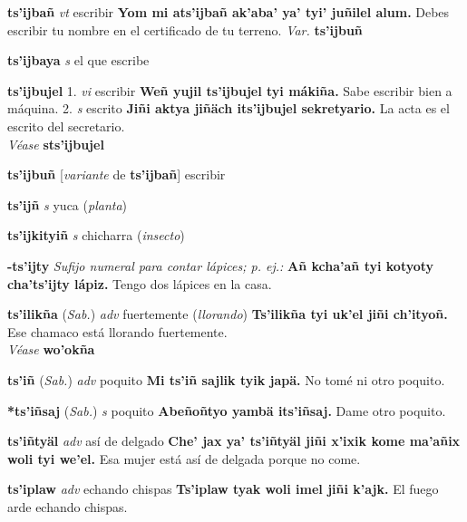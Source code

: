 \documentclass[10pt]{scrbook}
\newcommand{\entry}[1]{\textbf{#1}}
\newcommand{\onedefinition}[1]{#1.}
\newcommand{\nontranslationdef}[1]{\textit{#1}}
\newcommand{\partofspeech}[1]{\textit{#1}}
\newcommand{\spanishtranslation}[1]{#1}
\newcommand{\clarification}[1]{(\textit{#1})}
\newcommand{\cholexample}[1]{\textbf{#1}}
\newcommand{\exampletranslation}[1]{#1}
\newcommand{\alsosee}[1]{\\\textit{Véase} \textbf{#1}}
\newcommand{\relevantdialect}[1]{(\textit{#1})}
\newcommand{\variation}[1]{\textit{Var.} \textbf{#1}}
\newcommand{\conjugationtense}[1]{[\textit{#1}}
\newcommand{\conjugationverb}[1]{de \textbf{#1}]}
\begin{document}
\begin{multicols}{2}
\entry{ts'ijbañ}
\partofspeech{vt}
\spanishtranslation{escribir}
\cholexample{Yom mi ats'ijbañ ak'aba' ya' tyi' juñilel alum.}
\exampletranslation{Debes escribir tu nombre en el certificado de tu terreno.}
\variation{ts'ijbuñ}

\entry{ts'ijbaya}
\partofspeech{s}
\spanishtranslation{el que escribe}

\entry{ts'ijbujel}
\onedefinition{1}
\partofspeech{vi}
\spanishtranslation{escribir}
\cholexample{Weñ yujil ts'ijbujel tyi mákiña.}
\exampletranslation{Sabe escribir bien a máquina.}
\onedefinition{2}
\partofspeech{s}
\spanishtranslation{escrito}
\cholexample{Jiñi aktya jiñäch its'ijbujel sekretyario.}
\exampletranslation{La acta es el escrito del secretario.}
\alsosee{sts'ijbujel}

\entry{ts'ijbuñ}
\conjugationtense{variante}
\conjugationverb{ts'ijbañ}
\spanishtranslation{escribir}

\entry{ts'ijñ}
\partofspeech{s}
\spanishtranslation{yuca}
\clarification{planta}

\entry{ts'ijkityiñ}
\partofspeech{s}
\spanishtranslation{chicharra}
\clarification{insecto}

\entry{-ts'ijty}
\nontranslationdef{Sufijo numeral para contar lápices; p. ej.:}
\cholexample{Añ kcha'añ tyi kotyoty cha'ts'ijty lápiz.}
\exampletranslation{Tengo dos lápices en la casa.}

\entry{ts'ilikña}
\relevantdialect{Sab.}
\partofspeech{adv}
\spanishtranslation{fuertemente}
\clarification{llorando}
\cholexample{Ts'ilikña tyi uk'el jiñi ch'ityoñ.}
\exampletranslation{Ese chamaco está llorando fuertemente.}
\alsosee{wo'okña}

\entry{ts'iñ}
\relevantdialect{Sab.}
\partofspeech{adv}
\spanishtranslation{poquito}
\cholexample{Mi ts'iñ sajlik tyik japä.}
\exampletranslation{No tomé ni otro poquito.}

\entry{*ts'iñsaj}
\relevantdialect{Sab.}
\partofspeech{s}
\spanishtranslation{poquito}
\cholexample{Abeñoñtyo yambä its'iñsaj.}
\exampletranslation{Dame otro poquito.}

\entry{ts'iñtyäl}
\partofspeech{adv}
\spanishtranslation{así de delgado}
\cholexample{Che' jax ya' ts'iñtyäl jiñi x'ixik kome ma'añix woli tyi we'el.}
\exampletranslation{Esa mujer está así de delgada porque no come.}

\entry{ts'iplaw}
\partofspeech{adv}
\spanishtranslation{echando chispas}
\cholexample{Ts'iplaw tyak woli imel jiñi k'ajk.}
\exampletranslation{El fuego arde echando chispas.}


\end{multicols}
\end{document}
